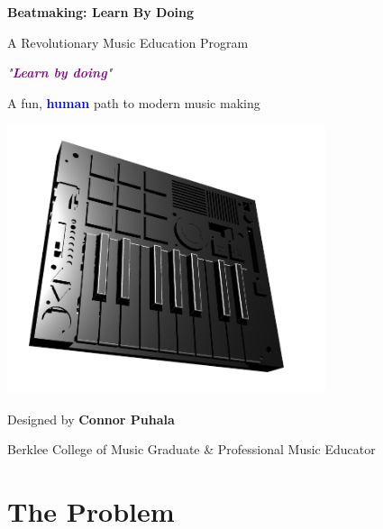\documentclass[11pt,letterpaper]{article}
\newcommand{\purple}[1]{\textcolor{purple}{\textbf{#1}}}
\newcommand{\bluepurple}[1]{\textcolor{blue}{\textbf{#1}}}
\begin{document}
\thispagestyle{empty}

\begin{center}
\vspace*{0.5cm}

{\Huge\bfseries\sffamily Beatmaking: Learn By Doing}

\vspace{0.4cm}

{\LARGE A Revolutionary Music Education Program}

\vspace{0.3cm}

{\large\itshape "\purple{Learn by doing}"}

\vspace{0.2cm}

{\large A fun, \bluepurple{human} path to modern music making}

\vspace{1cm}

\includegraphics[width=0.7\textwidth]{../../assets/images/beat_machine_3d_render.png}

\vspace{0.8cm}

{\normalsize Designed by \textbf{Connor Puhala}}

{\normalsize Berklee College of Music Graduate \& Professional Music Educator}

\end{center}

\vspace{1.2cm}

\section*{The Problem}
\end{document}
